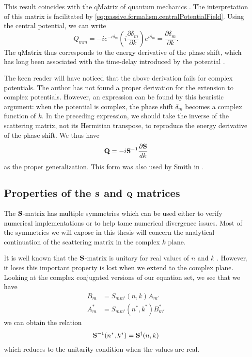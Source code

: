 This result coincides with the \gls{qMatrix} of quantum 
mechanics \cite{SMI1960}. The interpretation of this 
matrix is facilitated by \eqref{eq:passive.formalism.centralPotentialField}. 
Using the central potential, we can write
  \begin{equation}
    Q_{mm} = -ie^{-i\delta_m}\left(i\frac{\partial\delta_m}{\partial k}\right)e^{i\delta_m} = \frac{\partial\delta_m}{\partial k}.
  \end{equation}
The \gls{qMatrix} thus corresponds to the energy derivative of the 
phase shift, which has long been associated with the time-delay
introduced by the potential \cite{EIS1948,SMI1960,CAR2002}. 

The keen reader will have noticed that the above derivation
fails for complex potentials. The author has not found a proper
derivation for the extension to complex potentials. However, 
an expression can be found by this heuristic argument:
when the potential is complex, the phase shift $\delta_m$
becomes a complex function of $k$. In the preceding expression, 
we should take the inverse of the scattering matrix, not its Hermitian
transpose, to reproduce the energy derivative of the phase shift.
We thus have
  \begin{equation}
   \mathbf{Q} = -i\mathbf{S}^{-1}\frac{\partial\mathbf{S}}{dk}
  \end{equation}
as the proper generalization. This form was also used by Smith in
\cite{SMI1960}.
  
\subsection{Properties of the $\mathbf{S}$ and $\mathbf{Q}$ matrices}
The $\mathbf{S}$-matrix has multiple symmetries which can be used 
either to verify numerical implementations or to help tame 
numerical divergence issues. Most of the symmetries we will
expose in this thesis will concern the analytical continuation
of the scattering matrix in the complex $k$ plane. 

It is well known that the $\mathbf{S}$-matrix is unitary 
for real values of $n$ and $k$ \cite{NEW1982}. However, 
it loses this important property is lost when we extend
to the complex plane. Looking at the complex conjugated versions
of our equation set, we see that we have
  \begin{align*}
    B_m		&= S_{mm'}(n,k)A_{m'}	\\
    A_m^*	&= S_{mm'}(n^*,k^*)B_{m'}^*
  \end{align*}
we can obtain the relation
  \begin{equation}
    \label{eq:passive.formalism.generalizedSmatrix}
    \mathbf{S}^{-1}(n^*,k^*) = \mathbf{S}^\dagger(n,k)
  \end{equation}
which reduces to the unitarity condition when 
the values are real. 

